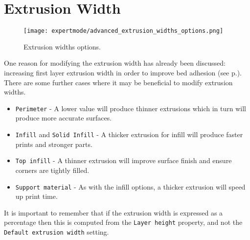 
\section{Extrusion Width} %
\label{sec:extrusion_width}

\begin{figure}[H]
\centering
\texttt{[image: expertmode/advanced\_extrusion\_widths\_options.png]}
\caption{Extrusion widths options.}
\label{fig:advanced_extrusion_widths_options}
\end{figure}

One reason for modifying the extrusion width has already been discussed: increasing first layer extrusion width in order to improve bed adhesion (see p.\pageref{par:wider_extrusion_width}).  There are some further cases where it may be beneficial to modify extrusion widths.
\begin{itemize}
    \item \texttt{Perimeter} - A lower value will produce thinner extrusions which in turn will produce more accurate surfaces.
    \item \texttt{Infill} and \texttt{Solid Infill} - A thicker extrusion for infill will produce faster prints and stronger parts.
    \item \texttt{Top infill} - A thinner extrusion will improve surface finish and ensure corners are tightly filled.
    \item \texttt{Support material} - As with the infill options, a thicker extrusion will speed up print time.
\end{itemize}

It is important to remember that if the extrusion width is expressed as a percentage then this is computed from the \texttt{Layer height} property, and not the \texttt{Default extrusion width} setting.

